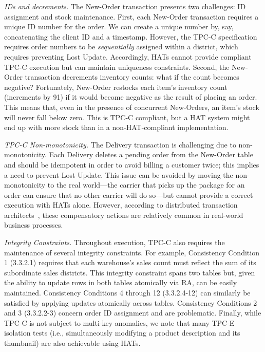 \vspace{.5em}\noindent\textit{IDs and decrements.} The New-Order transaction presents two challenges: ID assignment and
stock maintenance. First, each New-Order transaction requires a unique
ID number for the order. We can create a unique number by, say,
concatenating the client ID and a timestamp. However, the TPC-C
specification requires order numbers to be \textit{sequentially}
assigned within a district, which requires preventing Lost
Update. Accordingly, HATs cannot provide compliant TPC-C execution but
can maintain uniqueness constraints. Second, the New-Order
transaction decrements inventory counts: what if the count becomes
negative?  Fortunately, New-Order restocks each item's inventory
count (increments by 91) if it would become negative as the result of
placing an order. This means that, even in the presence of concurrent
New-Orders, an item's stock will never fall below zero. This is TPC-C
compliant, but a HAT system might end up with more stock than in a
non-HAT-compliant implementation.

\vspace{.5em}\noindent\textit{TPC-C Non-monotonicity.} The Delivery
transaction is challenging due to non-monotonicity. Each Delivery
deletes a pending order from the New-Order table and should be
idempotent in order to avoid billing a customer twice; this implies a
need to prevent Lost Update. This issue can be avoided by moving the
non-monotonicity to the real world---the carrier that picks up the
package for an order can ensure that no other carrier will do so---but
cannot provide a correct execution with HATs alone. However, according
to distributed transaction architects~\cite{entitygroup}, these
compensatory actions are relatively common in real-world business
processes.

\vspace{.5em}\noindent\textit{Integrity Constraints.} Throughout execution, TPC-C also requires the maintenance of several
integrity constraints. For example, Consistency Condition 1 (3.3.2.1)
requires that each warehouse's sales count must reflect the sum of its
subordinate sales districts. This integrity constraint spans two
tables but, given the ability to update rows in both tables atomically
via RA, can be easily maintained. Consistency Conditions 4 through 12
(3.3.2.4-12) can similarly be satisfied by applying updates atomically
across tables. Consistency Conditions 2 and 3 (3.3.2.2-3) concern
order ID assignment and are problematic. Finally, while TPC-C is not
subject to multi-key anomalies, we note that many TPC-E isolation
tests (i.e., simultaneously modifying a product description and its
thumbnail) are also achievable using HATs.

